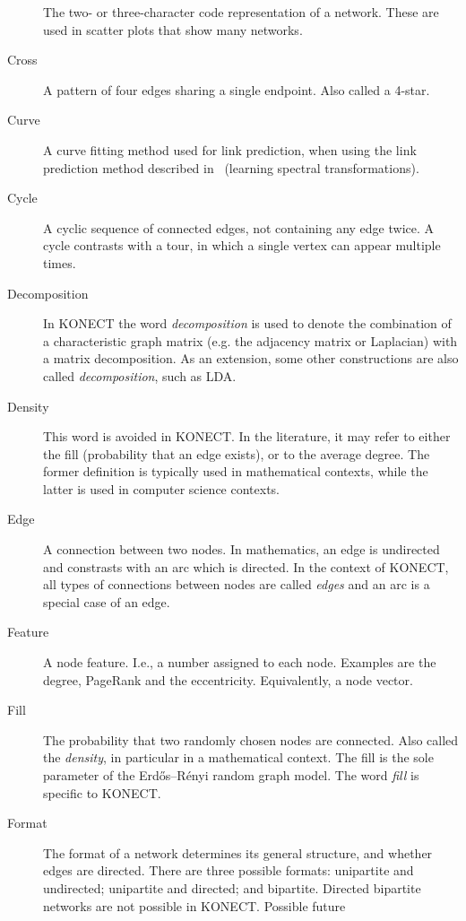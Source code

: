 \documentclass{article}
\begin{document}
\begin{description}
    The two- or three-character code representation of a network.  These
    are used in scatter plots that show many networks.  
  \item[Cross]
    A pattern of four edges sharing a single endpoint.  Also called a
    4-star.  
  \item[Curve]
    A curve fitting method used for link prediction, when using the link
    prediction method described
    in~\cite{kunegis:spectral-transformation} (learning spectral
    transformations).  
  \item[Cycle] 
    A cyclic sequence of connected edges, not containing any edge twice.
    A cycle contrasts with a tour, in which a single vertex can appear
    multiple times.  
  \item[Decomposition] In KONECT the word \emph{decomposition} is used
    to denote the combination of a characteristic graph matrix (e.g. the
    adjacency matrix or Laplacian) with a matrix decomposition.  As an
    extension, some other constructions are also called
    \emph{decomposition}, such as LDA.
  \item[Density] This word is avoided in KONECT.  In the literature, it
    may refer to either the fill (probability that an edge exists), or to
    the average degree.  The former definition is typically used in mathematical
    contexts, while the latter is used in computer science contexts.
  \item[Edge] A connection between two nodes.  In mathematics, an edge
    is undirected and constrasts with an arc which is directed.  In the
    context of KONECT, all types of connections between nodes are called
    \emph{edges} and an arc is a special case of an edge. 
  \item[Feature] A node feature. I.e., a number assigned to each node.
    Examples are the degree, PageRank and the eccentricity. 
    Equivalently, a node vector.
  \item[Fill] The probability that two randomly chosen nodes are
    connected.  Also called the \emph{density}, in particular in a
    mathematical context.  The fill is the sole parameter of the
    Erdős--Rényi random graph model.  The word \emph{fill} is specific
    to KONECT. 
  \item[Format] 
    The format of a network determines its general structure, and
    whether edges are directed.  There are three possible formats:
    unipartite and undirected; unipartite and directed; and bipartite.
    Directed bipartite networks are not possible in KONECT.  Possible future

\end{description}
\end{document}
